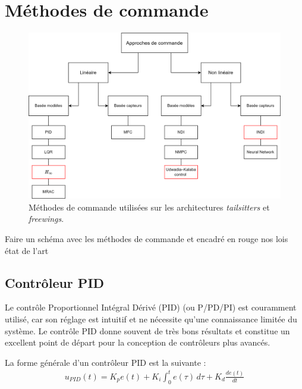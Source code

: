 \section{Méthodes de commande}
\begin{figure}[ht!]
    \centerline{
    \includegraphics[trim=0cm 0cm 0cm 0cm,clip,width=0.8\columnwidth]{figures/contole_methode.png}}
    \caption{Méthodes de commande utilisées sur les architectures \textit{tailsitters} et \textit{freewings}.}
    \label{fig:methodecmd}
\end{figure}

Faire un schéma avec les méthodes de commande et encadré en rouge nos lois
état de l'art

\subsection*{Contrôleur PID}
Le contrôle Proportionnel Intégral Dérivé (PID) (ou P/PD/PI) est couramment utilisé, car son réglage est intuitif et ne nécessite qu'une connaissance limitée du système. Le contrôle PID donne souvent de très bons résultats et constitue un excellent point de départ pour la conception de contrôleurs plus avancés.

La forme générale d'un contrôleur PID est la suivante :
\begin{align}
    u_{PID}(t) = K_{p} e(t) + K_{i} \int_{0}^{t} e(\tau) \,d\tau + K_{d} \frac{d e(t)}{dt}
\end{align}
